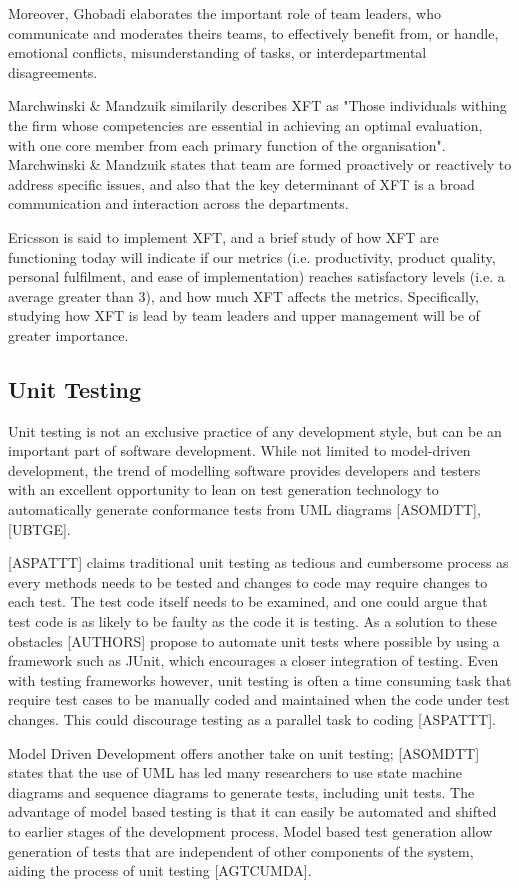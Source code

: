 \documentclass[fina_report_innit.tex]{subfiles}
\begin{document}
Moreover, Ghobadi elaborates the important role of team leaders, who communicate and moderates theirs teams, to effectively benefit from, or handle, emotional conflicts, misunderstanding of tasks, or interdepartmental disagreements.

Marchwinski \& Mandzuik similarily describes XFT as "Those individuals withing the firm whose competencies are essential in achieving an optimal evaluation, with one core member from each primary function of the organisation". Marchwinski \& Mandzuik states that team are formed proactively or reactively to address specific issues, and also that the key determinant of XFT is a broad communication and interaction across the departments.

Ericsson is said to implement XFT, and a brief study of how XFT are functioning today will indicate if our metrics (i.e. productivity, product quality, personal fulfilment, and ease of implementation) reaches satisfactory levels (i.e. a average greater than 3), and how much XFT affects the metrics. Specifically, studying how XFT is lead by team leaders and upper management will be of greater importance.

\subsection*{Unit Testing}
Unit testing is not an exclusive practice of any development style, but can be an important part of software development. While not limited to model-driven development, the trend of modelling software provides developers and testers with an excellent opportunity to lean on test generation technology to automatically generate conformance tests from UML diagrams [ASOMDTT], [UBTGE].  

[ASPATTT] claims traditional unit testing as tedious and cumbersome process as every methods needs to be tested and changes to code may require changes to each test. The test code itself needs to be examined, and one could argue that test code is as likely to be faulty as the code it is testing. As a solution to these obstacles [AUTHORS] propose to automate unit tests where possible by using a framework such as JUnit, which encourages a closer integration of testing. Even with testing frameworks however,  unit testing is often a time consuming task that require test cases to be manually coded and maintained when the code under test changes. This could discourage testing as a parallel task to coding [ASPATTT]. 

Model Driven Development offers another take on unit testing; [ASOMDTT] states that the use of UML has led many researchers to use state machine diagrams and sequence diagrams to generate tests, including unit tests. The advantage of model based testing is that it can easily be automated and shifted to earlier stages of the development process. Model based test generation allow generation of tests that are independent of other components of the system, aiding the process of unit testing [AGTCUMDA].
\end{document}
